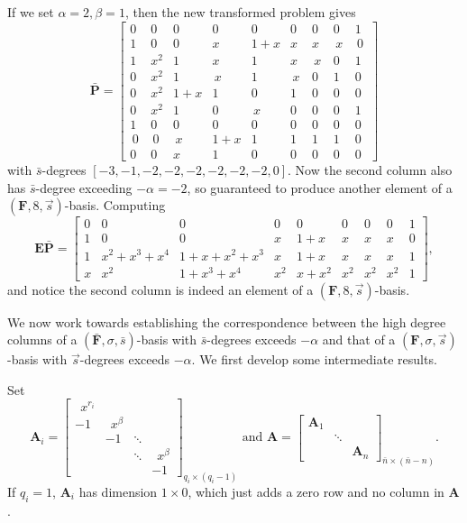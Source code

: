 \begin{exmp}
If we set $\alpha=2,\beta=1$, then the new transformed problem gives
\[
\bar{\mathbf{P}}=\left[{\begin{array}{ccccccccc}
0 & 0 & 0 & 0 & 0 & 0 & 0 & 0 & 1\\
1 & 0 & 0 & x & 1+x & x & x & \, x\, & \,0\,\\
1 & x^{2} & 1 & x & 1 & x & \, x\, & 0 & 1\\
0 & x^{2} & 1 & \, x\, & 1 & \, x\, & 0 & 1 & 0\\
0 & x^{2} & 1+x & 1 & 0 & 1 & 0 & 0 & 0\\
0 & x^{2} & 1 & 0 & \, x\, & 0 & 0 & 0 & 1\\
1 & 0 & 0 & 0 & 0 & 0 & 0 & 0 & 0\\
\,0\, & \,0\, & \, x\, & 1+x & 1 & 1 & 1 & 1 & 0\\
0 & 0 & x & 1 & 0 & 0 & 0 & 0 & 0\end{array}}\right]\]
 with $\bar{s}$-degrees $[-3,-1,-2,-2,-2,-2,-2,-2,0]$. Now the second
column also has $\bar{s}$-degree exceeding $-\alpha=-2$, so guaranteed
to produce another element of a $(\mathbf{F},8,\vec{s})$-basis. Computing
\[
\mathbf{E}\bar{\mathbf{P}}=\left[{\begin{array}{ccccccccr}
0 & 0 & 0 & 0 & 0 & 0 & 0 & 0 & 1\\
1 & 0 & 0 & x & 1+x & x & x & x & 0\\
1 & x^{2}+x^{3}+x^{4} & 1+x+x^{2}+x^{3} & x & 1+x & x & x & x & 1\\
x & x^{2} & 1+x^{3}+x^{4} & x^{2} & x+x^{2} & x^{2} & x^{2} & x^{2} & 1\end{array}}\right],\]
 and notice the second column is indeed an element of a $(\mathbf{F},8,\vec{s})$-basis. 
\end{exmp}
We now work towards establishing the correspondence between the high
degree columns of a $\left(\bar{\mathbf{F}},\sigma,\bar{s}\right)$-basis
with $\bar{s}$-degrees exceeds $-\alpha$ and that of a $\left(\mathbf{F},\sigma,\vec{s}\right)$-basis
with $\vec{s}$-degrees exceeds $-\alpha$. We first develop some
intermediate results.

Set \[
\mathbf{A}_{i}=\begin{bmatrix}~~x^{r_{i}}\\
-1 & ~~x^{\beta}\\
 & -1 & \ddots\\
 &  & \ddots & ~~x^{\beta}\\
 &  &  & -1\end{bmatrix}_{q_{i}\times(q_{i}-1)}\mbox{ and }\mathbf{A}=\left[\begin{array}{ccc}
\mathbf{A}_{1}\\
 & \ddots\\
 &  & \mathbf{A}_{n}\end{array}\right]_{\bar{n}\times(\bar{n}-n)}.\]
 If $q_{i}=1$, $\mathbf{A}_{i}$ has dimension $1\times0$, which
just adds a zero row and no column in $\mathbf{A}$.


